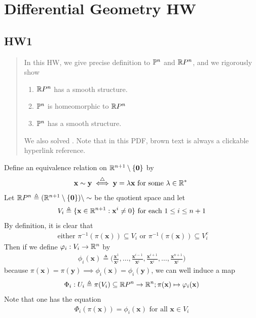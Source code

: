 \documentclass{report}
\begin{document}
\chapter{Differential Geometry HW} 
\section{HW1} 
\begin{abstract}
In this HW, we give precise definition to $\P^n$  and $\RP^n$, and we rigorously show
\begin{enumerate}[label=(\alph*)]
  \item $\RP^n$  has a smooth structure. 
  \item $\P^n$ is homeomorphic to $\RP^n$ 
   \item $\P^n$ has a smooth structure.
\end{enumerate}
We also solved  . Note that in this PDF, brown text is always a clickable hyperlink reference.  
\end{abstract}
\begin{mdframed}
Define an equivalence relation on $\R^{n+1}\setminus \set{\textbf{0}}$ by 
\begin{align*}
\textbf{x}\sim \textbf{y}\overset{\triangle}{\iff }\textbf{y}=\ld \textbf{x}\text{ for some $\ld \inr^*$ } 
\end{align*}
Let $\RP ^n\triangleq (\R^{n+1}\setminus \set{\textbf{0}})\setminus \sim $ be the quotient space and let  
\begin{align*}
V_i\triangleq \set{\textbf{x}\inr^{n+1}:\textbf{x}^i \neq 0}\text{ for each }1\leq i\leq n+1
\end{align*}
By definition, it is clear that 
\begin{align*}
\text{ either }\pi^{-1}(\pi (\textbf{x}))\subseteq V_i\text{ or }\pi^{-1}(\pi (\textbf{x}))\subseteq V_i^c
\end{align*}
Then if we define $\phi_i:V_i\rightarrow \R^n$ by
\begin{align*}
\phi_i(\textbf{x})\triangleq \Big(\frac{\textbf{x}^1}{\textbf{x}^i},\dots ,\frac{\textbf{x}^{i-1}}{\textbf{x}^i},\frac{\textbf{x}^{i+1}}{\textbf{x}^i},\dots,\frac{\textbf{x}^{n+1}}{\textbf{x}^i} \Big)
\end{align*}
because $\pi (\textbf{x})=\pi(\textbf{y})\implies \phi_i(\textbf{x})=\phi_i(\textbf{y})$, we can well induce a map 
\begin{align*}
\Phi_i:U_i\triangleq \pi (V_i)\subseteq \R P^n\rightarrow \R^n; \pi (\textbf{x})\mapsto \phi_i(\textbf{x})
\end{align*}
Note that one has the equation 
\begin{align*}
\Phi_i(\pi (\textbf{x}))= \phi_i(\textbf{x})\text{ for all }\textbf{x}\in V_i
\end{align*}
\end{mdframed}
\end{document}
